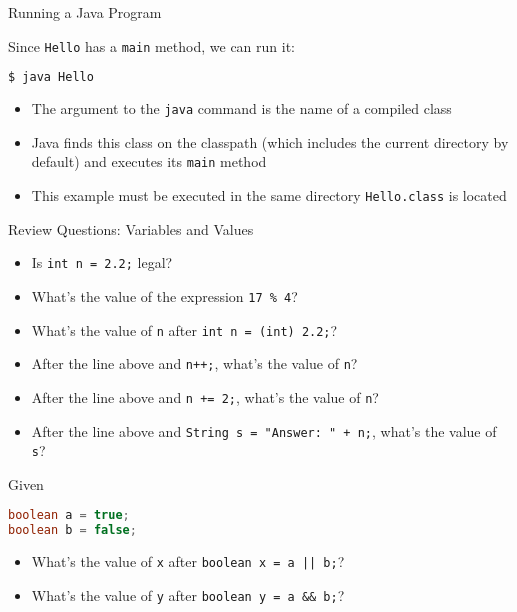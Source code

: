 \documentclass{beamer}
\begin{document}
\begin{frame}[fragile]{Running a Java Program}


Since {\tt Hello} has a {\tt main} method, we can run it:
\begin{lstlisting}[language=Java]
$ java Hello
\end{lstlisting}
\begin{itemize}
\item The argument to the {\tt java} command is the name of a compiled class
\item Java finds this class on the classpath (which includes the current directory by default) and executes its {\tt main} method
\item This example must be executed in the same directory {\tt Hello.class} is located
\end{itemize}



\end{frame}

\begin{frame}[fragile]{Review Questions: Variables and Values}

\begin{itemize}
\item Is {\tt int n = 2.2;} legal?
\item What's the value of the expression {\tt 17 \% 4}?
\item What's the value of {\tt n} after {\tt int n = (int) 2.2;}? 
\item After the line above and {\tt n++;}, what's the value of {\tt n}?
\item After the line above and {\tt n += 2;}, what's the value of {\tt n}?
\item After the line above and {\tt String s = "Answer: " + n;}, what's the value of {\tt s}?
\end{itemize}
Given
\begin{lstlisting}[language=Java]
boolean a = true;
boolean b = false;
\end{lstlisting}
\vspace{-.1in}
\begin{itemize}
\item What's the value of {\tt x} after {\tt boolean x = a || b;}? 
\item What's the value of {\tt y} after {\tt boolean y = a \&\& b;}? 
\end{itemize}


\end{frame}
\end{document}

